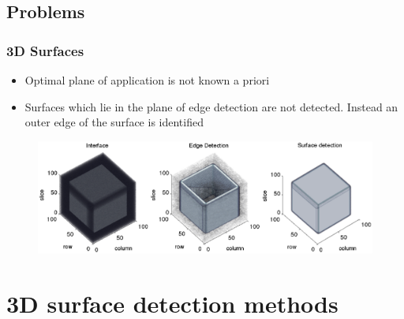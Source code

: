 \documentclass[9pt]{beamer}
\begin{document}
	\subsection{Problems}
	
		\begin{frame}
				\frametitle{3D Surfaces}

						\begin{itemize}
							\item Optimal plane of application is not known a priori
								\item Surfaces which lie in the plane of edge detection are not detected. Instead an outer edge of the surface is identified
						\end{itemize}
				
	\begin{flushright}
				\begin{figure}
								\includegraphics[scale=0.45]{fail2d}
					\end{figure}
	\end{flushright}

			\end{frame}
			

\section{3D surface detection methods}
\end{document}
